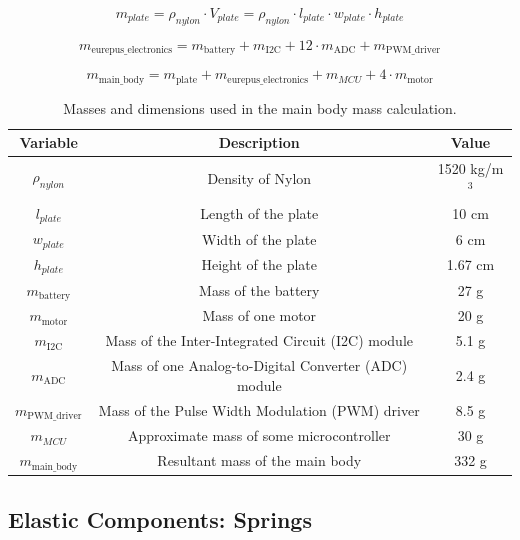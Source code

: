 \begin{equation}
\label{eq:Nylon_plate}
m_{plate} = \rho_{nylon} \cdot V_{plate} = \rho_{nylon} \cdot l_{plate} \cdot w_{plate} \cdot h_{plate}
\end{equation}

\begin{equation}
\label{eq:eurepus_electronics}
m_{\text{eurepus\_electronics}} = m_{\text{battery}} + m_{\text{I2C}} + 12 \cdot m_{\text{ADC}} + m_{\text{PWM\_driver}}
\end{equation}

\begin{equation}
\label{eq:main_body_mass}
m_{\text{main\_body}} = m_{\text{plate}} + m_{\text{eurepus\_electronics}}+m_{MCU}+ 4 \cdot m_{\text{motor}}
\end{equation}

\begin{table}
\centering
\begin{tabular}{|c|c|c|}
\hline
\textbf{Variable} & \textbf{Description} & \textbf{Value} \\
\hline
$\rho_{nylon}$ & Density of Nylon & 1520 kg/m$^3$  \\
$l_{plate}$ & Length of the plate & 10 cm \\
$w_{plate}$ & Width of the plate & 6 cm \\
$h_{plate}$ & Height of the plate & 1.67 cm \\
$m_{\text{battery}}$ & Mass of the battery & 27 g  \\
$m_{\text{motor}}$ & Mass of one motor & 20 g  \\
$m_{\text{I2C}}$ & Mass of the Inter-Integrated Circuit (I2C) module & 5.1 g  \\
$m_{\text{ADC}}$ & Mass of one Analog-to-Digital Converter (ADC) module & 2.4 g  \\
$m_{\text{PWM\_driver}}$ & Mass of the Pulse Width Modulation (PWM) driver & 8.5 g  \\
$m_{MCU}$ & Approximate mass of some microcontroller & 30 g \\
$m_{\text{main\_body}}$ & Resultant mass of the main body & 332 g \\
\hline
\end{tabular}
\caption{Masses and dimensions used in the main body mass calculation.}
\label{tab:component_masses}
\end{table}


\subsection{Elastic Components: Springs}

